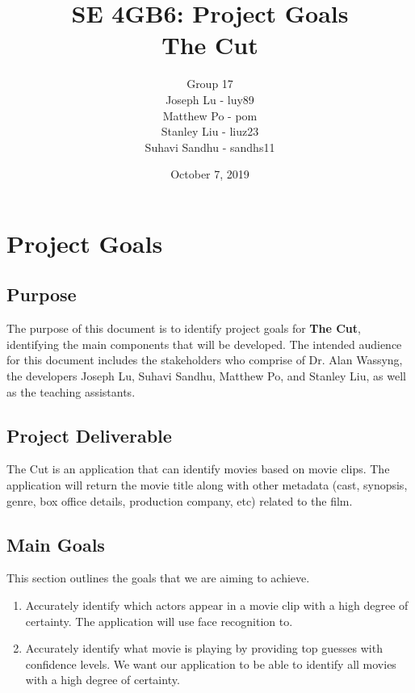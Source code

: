 \documentclass[12pt, titlepage]{article}
\title{SE 4GB6: Project Goals\\ The Cut}
\author{Group 17
		\\ Joseph Lu - luy89
		\\ Matthew Po - pom
		\\ Stanley Liu - liuz23
		\\ Suhavi Sandhu - sandhs11
}
\date{October 7, 2019}
\begin{document}
\maketitle	
\newpage

\section{Project Goals}
\label{sec:project_goals}

\subsection{Purpose}
\label{sub:purpose}
    The purpose of this document is to identify project goals for \textbf{The Cut}, identifying the main components that will be developed. The intended audience for this document includes the stakeholders who comprise of Dr. Alan Wassyng, the developers Joseph Lu, Suhavi Sandhu, Matthew Po, and Stanley Liu, as well as the teaching assistants.

\subsection{Project Deliverable}
\label{sub:system_description}

 The Cut is an application that can identify movies based on movie clips. The application will return the movie title along with other metadata (cast, synopsis, genre, box office details, production company, etc) related to the film.


\subsection{Main Goals}
\label{sub:main_goals}

This section outlines the goals that we are aiming to achieve.
	
\begin{enumerate}
    \item Accurately identify which actors appear in a movie clip with a high degree of certainty. The application will use face recognition to.
	\item Accurately identify what movie is playing by providing top guesses with confidence levels. We want our application to be able to identify all movies with a high degree of certainty.
\end{enumerate}
\end{document}
